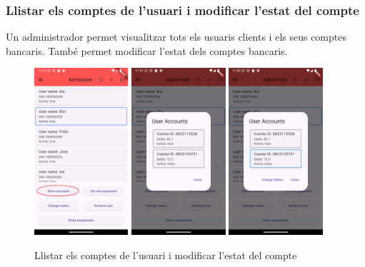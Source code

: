 \documentclass[a4paper,12pt,twoside]{ThesisStyle}
\begin{document}
\clearpage
\subsubsection{Llistar els comptes de l'usuari i modificar l'estat del compte}
\label{subsubsec:Llistar els comptes de l'usuari i modificar l'estat del compte}

Un administrador permet visualitzar tots els usuaris clients i els seus comptes bancaris. També permet modificar l'estat dels comptes bancaris.

\begin{figure}[h]
    \centering
    \includegraphics[width=0.31\textwidth]{imatges/mainAdmin1.png}
    \includegraphics[width=0.31\textwidth]{imatges/userAccounts1.png}
    \includegraphics[width=0.31\textwidth]{imatges/userAccounts2.png}
    \caption{Llistar els comptes de l'usuari i modificar l'estat del compte}
    \label{fig: Llistar els comptes de l'usuari i modificar l'estat del compte}
\end{figure}
\end{document}
